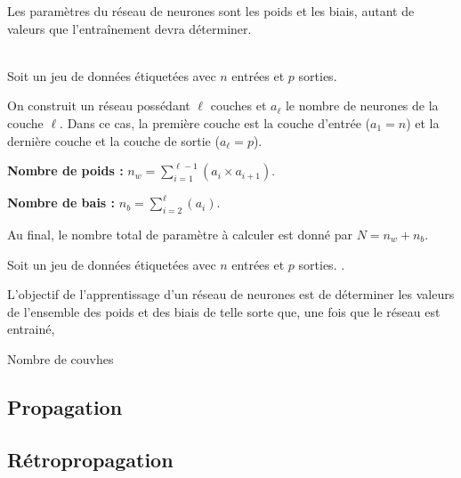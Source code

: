 \begin{defi}[Paramètres]

Les paramètres du réseau de neurones sont les poids et les biais, autant de valeurs que l’entraînement devra déterminer.

\end{defi}
\begin{methode} ~\\

Soit un jeu de données étiquetées avec $n$ entrées et $p$ sorties.

On construit un réseau possédant $\ell$ couches  et $a_\ell$ le nombre de neurones de la couche  $\ell$. Dans ce cas, la première couche est la couche d'entrée ($a_1 = n$) et la dernière couche et la couche de sortie ($a_\ell= p$).


\textbf{Nombre de poids :} $n_w = \sum\limits_{i=1}^{\ell-1} \left(a_i \times a_{i+1}\right)$.

\textbf{Nombre de bais :} $n_b = \sum\limits_{i=2}^{\ell}\left( a_i  \right)$.


Au final, le nombre total de paramètre à calculer est donné par $N=n_w+n_b$.

\end{methode}
\begin{obj}
Soit un jeu de données étiquetées avec $n$ entrées et $p$ sorties. .


L'objectif de l'apprentissage d'un réseau de neurones est de déterminer les valeurs de  l'ensemble des poids et des biais de telle sorte que, une fois que le réseau est entrainé, 
\end{obj}



\begin{defi}

Nombre de couvhes
\end{defi}


\subsection{Propagation}

\subsection{Rétropropagation}


\begin{defi}
\end{defi}


